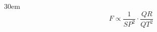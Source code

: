 \documentclass[border=4pt]{standalone}
\begin{document}
\begin{varwidth}{30em}
\large
\[ F \propto \dfrac{1}{SP^2}\cdot\dfrac{QR}{QT^2} \]

\end{varwidth}
\end{document}
